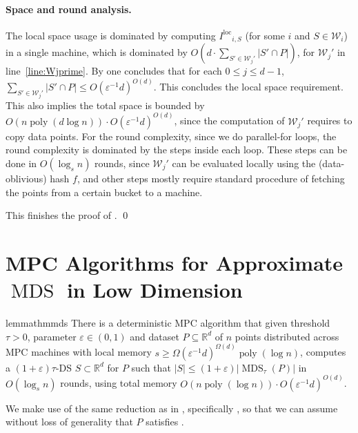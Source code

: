 \documentclass[11pt,letterpaper]{article}
\theoremstyle{plain}
\theoremstyle{definition}
\theoremstyle{remark}
\DeclareMathOperator{\poly}{poly}
\DeclareMathOperator{\MDS}{MDS}
\newcommand{\Iloc}{\ensuremath{I^{\mathrm{loc}}}\xspace}
\renewcommand{\epsilon}{\ensuremath{\varepsilon}}
\let\epsilon\varepsilon
\begin{document}
\paragraph{Space and round analysis.}
    The local space usage is dominated by
    computing $\Iloc_{i, S}$ (for some $i$ and $S \in \mathcal{W}_i$) in a single machine,
    which is dominated by $O(d\cdot \sum_{S'\in \mathcal{W}_j'}|S'\cap P|)$, for $\mathcal{W}_j'$ in line~\ref{line:Wjprime}. 
    By  one concludes that for each $0\leq j\leq d-1$, $\sum_{S'\in \mathcal{W}_j'}|S'\cap P| \leq O(\varepsilon^{-1}d)^{O(d)}$. 
This concludes the local space requirement.
    This also implies the total space is bounded by 
    $O(n\poly(d\log n))\cdot O(\varepsilon^{-1}d)^{O(d)}$, since the computation of $\mathcal{W}_j'$ requires to copy data points. 
    For the round complexity,
    since we do parallel-for loops, the round complexity is dominated by the steps inside each loop.
    These steps can be done in $O(\log_s n)$ rounds,
    since $\mathcal{W}_j'$ can be evaluated locally using the (data-oblivious) hash $f$,
    and other steps mostly require standard procedure of fetching the points from a certain bucket to a machine.

    This finishes the proof of . 
    \qed
    






 
    \section{MPC Algorithms for Approximate $\MDS$ in Low Dimension}
\label{sec:mds}


\begin{restatable}{lemma}{thmmds}
    \label{thm:mds} 
    There is a deterministic MPC algorithm that given threshold $\tau > 0$,  parameter $\varepsilon\in(0,1)$ and dataset $P\subseteq \mathbb{R}^d$ of $n$ points distributed across MPC machines with local memory $s\geq \Omega(\varepsilon^{-1}d)^{\Omega(d)}\poly(\log n)$, 
computes a $(1 + \epsilon)\tau$-DS $S \subset \mathbb{R}^{d}$ for $P$ such that $|S| \leq (1 + \epsilon) |\MDS_{\tau}(P)|$ in $O(\log_{s}n)$ rounds, using total memory $O(n \poly(\log n))\cdot O(\varepsilon^{-1}d)^{O(d)}$. 
\end{restatable}
We make use of the same reduction as in , specifically ,
so that we can assume without loss of generality that $P$ satisfies .
\end{document}
